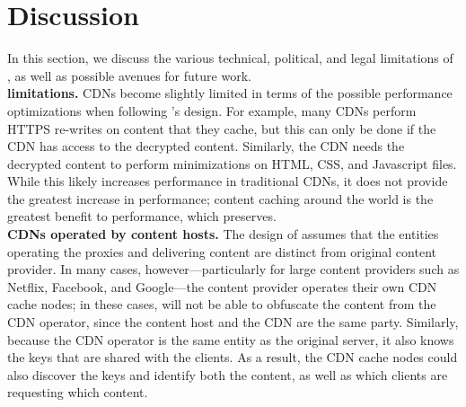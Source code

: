 \section{Discussion}
\label{sec:discussion}
In this section, we discuss the various technical, political, and legal limitations
of \system{}, as well as possible avenues for future work. \\
\vspace{0pt}
\textbf{\system{} limitations.} CDNs become slightly limited in terms of the 
possible performance optimizations when following \system{}'s design.  For example, 
many CDNs perform HTTPS re-writes on content that they cache, but this can only be 
done if the CDN has access to the decrypted content.  Similarly, the CDN needs the 
decrypted content to perform minimizations on HTML, CSS, and Javascript files.  While 
this likely increases performance in traditional CDNs, it does not provide the greatest 
increase in performance; content caching around the world is the greatest benefit to 
performance, which \system{} preserves.\\
\vspace{0pt}
\textbf{CDNs operated by content hosts.} The design of \system{}
assumes that the entities operating the proxies and delivering content are
distinct from original content provider. In many cases, however---particularly
for large content providers such as Netflix, Facebook, and Google---the
content provider operates their own CDN cache nodes; in these cases, \system{} will
not be able to obfuscate the content from the CDN operator, since the content host
and the CDN are the same party.  Similarly, because the CDN operator is the same
entity as the original server, it also knows the keys that are shared with the clients.
As a result, the CDN cache nodes could also discover the keys and identify both
the content, as well as which clients are requesting which content.\\
\vspace{0pt}
